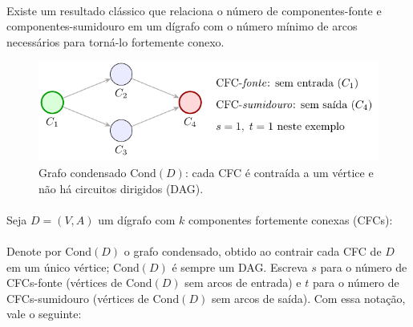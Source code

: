 \documentclass[12pt,a4paper]{article}
\def\emph#1{#1}%
\begin{document}
\paragraph{}
Existe um resultado clássico que relaciona o número de componentes-fonte e componentes-sumidouro em um dígrafo com o número mínimo de arcos necessários para torná-lo fortemente conexo.


\begin{figure}[H]
    \centering
    \includegraphics[width=0.9\linewidth]{figures/fig_condensado_st.pdf}

    \caption{Grafo condensado $\mathrm{Cond}(D)$: cada CFC é contraída a um vértice e não há circuitos dirigidos (DAG).}
    \label{fig:condensado-st}
    \end{figure}


\paragraph{}
Seja $D=(V,A)$ um dígrafo com $k$ componentes fortemente conexas (CFCs): 

\paragraph{}
Denote por $\mathrm{Cond}(D)$ o grafo \emph{condensado}, obtido ao contrair cada CFC de $D$ em um único vértice; $\mathrm{Cond}(D)$ é sempre um DAG. Escreva $s$ para o número de CFCs-\emph{fonte} (vértices de $\mathrm{Cond}(D)$ sem arcos de \emph{entrada}) e $t$ para o número de CFCs-\emph{sumidouro} (vértices de $\mathrm{Cond}(D)$ sem arcos de \emph{saída}). Com essa notação, vale o seguinte:
\end{document}

